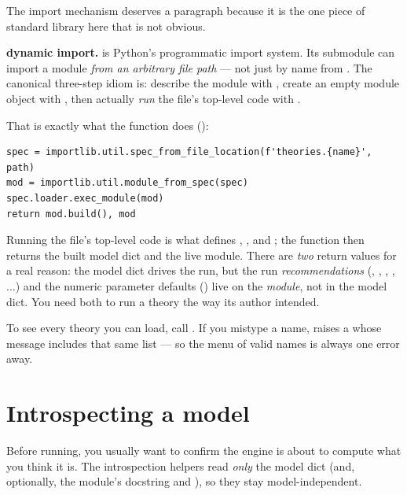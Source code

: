 The import mechanism deserves a paragraph because it is the one piece of standard
library here that is not obvious.

\begin{defn}
\textbf{ dynamic import.}  is Python's
programmatic import system. Its  submodule can import a module
\emph{from an arbitrary file path} --- not just by name from . The
canonical three-step idiom is: describe the module with
, create an empty module object with
, then actually \emph{run} the file's top-level code with
.
\end{defn}

That is exactly what the function does ():

\begin{lstlisting}
spec = importlib.util.spec_from_file_location(f'theories.{name}', path)
mod = importlib.util.module_from_spec(spec)
spec.loader.exec_module(mod)
return mod.build(), mod
\end{lstlisting}

Running the file's top-level code is what defines ,
, and ; the function then returns the
built model dict and the live module. There are \emph{two} return values for a
real reason: the model dict drives the run, but the run \emph{recommendations}
(, , ,
, $\ldots$) and the numeric parameter
defaults () live on the \emph{module}, not in the model
dict. You need both to run a theory the way its author intended.

\begin{note}
To see every theory you can load, call . If you mistype
a name,  raises a  whose message
includes that same list --- so the menu of valid names is always one error away.
\end{note}

\section{Introspecting a model}

Before running, you usually want to confirm the engine is about to compute what
you think it is. The introspection helpers read \emph{only} the model dict (and,
optionally, the module's docstring and ), so they stay
model-independent.


